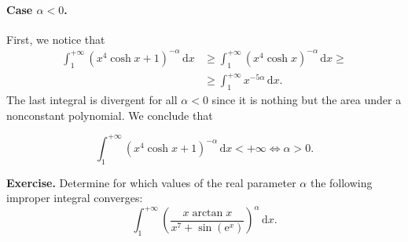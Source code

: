 \documentclass[a4paper,10 pt]{report}
\newcommand{\finalanswer}[1]{%
    \begin{finalAnswer}
    \[
        #1
    \]
    \end{finalAnswer}
}
\theoremstyle{definition}
\begin{document}
\begin{solutionBox}
\paragraph{Case $\alpha < 0$.} First, we notice that
\begin{equation*}\begin{aligned} \int_1^{+ \infty} \left( x^4 \cosh x + 1 \right)^{-\alpha} \, \mathrm{d}x & \geq \int_1^{+ \infty} (x^4 \cosh x)^{-\alpha} \, \mathrm{d}x \geq
\\[1em] & \geq \int_1^{+ \infty} x^{- 5 \alpha} \, \mathrm{d}x. \end{aligned} \end{equation*}
The last integral is divergent for all $\alpha < 0$ since it is nothing but the area under a nonconstant polynomial. We conclude that
\finalanswer{
\int_1^{+ \infty} \left( x^4 \cosh x + 1 \right)^{-\alpha} \, \mathrm{d}x < + \infty \iff \alpha > 0.
}\end{solutionBox}

\begin{exerciseBox} \textbf{Exercise.}  Determine for which values of the real parameter $\alpha$ the following improper integral converges:
\begin{equation*} \int_1^{+ \infty} \left( \frac{x \arctan x}{x^7 + \sin( \mathrm{e}^x )} \right)^{\alpha} \, \mathrm{d}x. \end{equation*} \end{exerciseBox}
\end{document}
